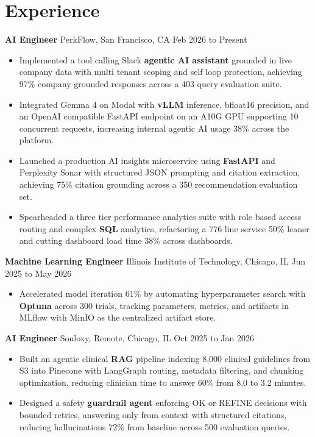 \documentclass[letterpaper,10pt]{article}
\newcommand{\resumeItem}[1]{\item\small{#1}}
\begin{document}
\section*{Experience}
\textbf{AI Engineer} \hfill PerkFlow, San Francisco, CA \hfill Feb 2026 to Present
\begin{itemize}[leftmargin=0.15in]
  \resumeItem{Implemented a tool calling Slack \textbf{agentic AI assistant} grounded in live company data with multi tenant scoping and self loop protection, achieving 97\% company grounded responses across a 403 query evaluation suite.}
  \resumeItem{Integrated Gemma 4 on Modal with \textbf{vLLM} inference, bfloat16 precision, and an OpenAI compatible FastAPI endpoint on an A10G GPU supporting 10 concurrent requests, increasing internal agentic AI usage 38\% across the platform.}
  \resumeItem{Launched a production AI insights microservice using \textbf{FastAPI} and Perplexity Sonar with structured JSON prompting and citation extraction, achieving 75\% citation grounding across a 350 recommendation evaluation set.}
  \resumeItem{Spearheaded a three tier performance analytics suite with role based access routing and complex \textbf{SQL} analytics, refactoring a 776 line service 50\% leaner and cutting dashboard load time 38\% across dashboards.}
\end{itemize}

\textbf{Machine Learning Engineer} \hfill Illinois Institute of Technology, Chicago, IL \hfill Jun 2025 to May 2026
\begin{itemize}[leftmargin=0.15in]
  \resumeItem{Accelerated model iteration 61\% by automating hyperparameter search with \textbf{Optuna} across 300 trials, tracking parameters, metrics, and artifacts in MLflow with MinIO as the centralized artifact store.}
\end{itemize}

\textbf{AI Engineer} \hfill Souloxy, Remote, Chicago, IL \hfill Oct 2025 to Jan 2026
\begin{itemize}[leftmargin=0.15in]
  \resumeItem{Built an agentic clinical \textbf{RAG} pipeline indexing 8,000 clinical guidelines from S3 into Pinecone with LangGraph routing, metadata filtering, and chunking optimization, reducing clinician time to answer 60\% from 8.0 to 3.2 minutes.}
  \resumeItem{Designed a safety \textbf{guardrail agent} enforcing OK or REFINE decisions with bounded retries, answering only from context with structured citations, reducing hallucinations 72\% from baseline across 500 evaluation queries.}
\end{itemize}
\end{document}
